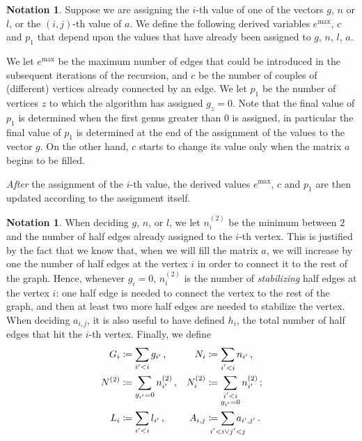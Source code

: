\documentclass{amsart}
\theoremstyle{plain}
\theoremstyle{definition}
\newtheorem{notation}[theorem]{Notation}
\DeclareMathOperator{\MAX}{max}
\begin{document}
\begin{notation}
  Suppose we are assigning the $i$-th value of one of the vectors
  $g$, $n$ or $l$, or the $(i,j)$-th value of $a$. We define the
  following derived variables $e^{\MAX}$, $c$ and $p_1$ that depend
  upon the values that have already been assigned to $g$, $n$, $l$, $a$.

  We let $e^{\MAX}$ be the maximum number of edges that could be
  introduced in the subsequent iterations of the recursion, and $c$ be
  the number of couples of (different) vertices already connected by
  an edge. We let $p_1$ be the number of vertices $z$ to which the
  algorithm has assigned $g_z = 0$.  Note that the final value of
  $p_1$ is determined when the first genus greater than $0$ is
  assigned, in particular the final value of $p_1$ is determined at
  the end of the assignment of the values to the vector $g$.  On the
  other hand, $c$ starts to change its value only when the matrix $a$
  begins to be filled.

  \emph{After} the assignment of the $i$-th value, the derived values
  $e^{\MAX}$, $c$ and $p_1$ are then updated according to the
  assignment itself.
\end{notation}

\begin{notation} \label{not:partial_assign}
  When deciding $g$, $n$, or $l$, we let $n^{(2)}_i$ be the minimum
  between $2$ and the number of half edges already assigned to the
  $i$-th vertex. This is justified by the fact that we know that, when
  we will fill the matrix $a$, we will increase by one the number of
  half edges at the vertex $i$ in order to connect it to the rest of
  the graph. Hence, whenever $g_i = 0$, $n^{(2)}_i$ is the number of
  \emph{stabilizing\/} half edges at the vertex $i$: one half edge is
  needed to connect the vertex to the rest of the graph, and then at
  least two more half edges are needed to stabilize the vertex. When
  deciding $a_{i,j}$, it is also useful to have defined $h_i$, the
  total number of half edges that hit the $i$-th vertex. Finally, we
  define
  \begin{align*}
    G_i &\coloneqq \sum_{i^\prime < i} g_{i^\prime}\,\text{,} &
    N_i &\coloneqq \sum_{\substack{i^\prime < i}} n_{i^\prime}\,\text{,}\\
    N^{(2)} &\coloneqq \sum_{g_{i^\prime} = 0} n^{(2)}_{i^\prime}\,\text{,} &
    N^{(2)}_i &\coloneqq \sum_{\substack{i^\prime < i\\g_{i^\prime} = 0}} n^{(2)}_{i^\prime}\,\text{;}\\
    L_i &\coloneqq \sum_{i^\prime < i} l_{i^\prime}\,\text{,} &
    A_{i,j} &\coloneqq \sum_{\mathclap{i^\prime < i \vee j^\prime < j}} a_{i^\prime, j^\prime}\,\text{.}
  \end{align*}
\end{notation}
\end{document}
